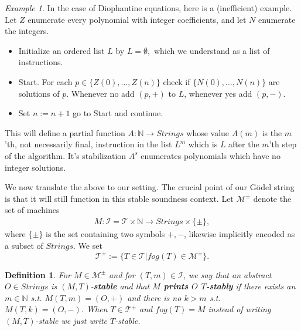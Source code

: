 \documentclass{amsart}  %
\numberwithin{equation}{section}
\newtheorem{definition}[equation]{Definition}
\theoremstyle{definition}
\newtheorem{notation}{Notation}
\theoremstyle{remark}
\newtheorem{example}[equation]{Example}
\begin{document}
{\begin{example}
In the case of Diophantine equations, here is a (inefficient) example.
Let $Z$ enumerate every polynomial with integer coefficients, and let $N$ enumerate the integers. 
\begin{itemize}
   \item Initialize an ordered list $L$  by $L=\emptyset,$
which we understand as a list of instructions. 
\item Start. For each $p \in \{Z (0), \ldots, Z (n)\}$ check if $\{N(0), \ldots, N(n)\}$ are solutions of $p$. Whenever no add $(p,+)$ to $L$, whenever yes add $(p,-)$. 
\item Set $n:=n+1$ go to Start and continue.
\end{itemize}
This will define a partial function $A: \mathbb{N} \to Strings$ whose value $A (m)$ is the $m$'th, not necessarily final, instruction in the list $L ^{m} $ which is $L$ after the $m$'th step of the algorithm. It's stabilization $A ^{s}$ enumerates polynomials which have no integer solutions.  \end{example} 
 We now translate the above to our setting. The crucial point of our G\"odel string is that it will still function in this stable soundness context.
Let $\mathcal{M} ^{\pm}  $ denote the set of machines
\begin{align*}
{M}: \mathcal{I} = \mathcal{T} \times \mathbb{N} \to Strings \times \{\pm\},
\end{align*}
where $\{\pm\}$ is the set containing two symbols $+,-$, likewise implicitly encoded as a subset of $Strings$.
We set $$\mathcal{T}  ^{\pm} := \{T \in \mathcal{T}| fog (T) \in \mathcal{M} ^{\pm} \}.
$$  
\begin{definition} 
   For ${M} \in \mathcal{M} ^{\pm}  $ and for $ (T,m) \in \mathcal{I} $, we say that an abstract $O \in Strings$ is $(M,T)$-\textbf{\emph{stable}} and that \textbf{\emph{$M$ prints $O$ $T$-stably}} if there exists an $m \in \mathbb{N}$ s.t.  ${M} (T,m) = (O, +) $ and there is no $k>m$ s.t. $M (T,k) = (O,-)$.  When $T \in \mathcal{T} ^{\pm} $  and $fog (T)=M$ instead of writing $(M,T)$-stable we just write $T$-stable.
\end{definition}
}
\end{document}
